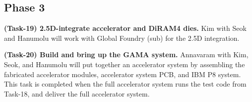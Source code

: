 \subsection{Phase 3}
\noindent
\textbf{(Task-19) 2.5D-integrate accelerator and DiRAM4 dies.}
Kim with Seok and Hanumolu will work with Global Foundry (sub) for the 2.5D integration.


\vspace{3pt}
\noindent
\textbf{(Task-20) Build and bring up the GAMA system.}
Annavaram with Kim, Seok, and Hanumolu will put together an accelerator system by assembling
the fabricated accelerator modules, accelerator system PCB, and IBM P8 system.
This task is completed when the full accelerator system runs the test code from Task-18, and deliver the full accelerator system.


\begin{comment}
Task 3.X: Our accelerator chip fabrication and chip-level testing \underline{Seok (Columbia), Kim (UIUC), Hanumolu (UIUC), Annavaram (USC), Hwu (UIUC)}
Completion criteria: fabricated chips, verified in the chip level
Approach: We will perform intensive pre-silicon verifications for functional, thermal, voltage integrity, noise, and testability aspects. We will tape-out the accelerator chip in a 28nm CMOS technology. We will test the accelerator chip without DiRAMs. 
Task 3.2: 2.5D integration of our accelerator chip and memory stacks, packaging, and testing \underline{?}
Completion criteria and deliverables: Functioning 2.5D integrated hardware of the accelerators and DiRAMs. 
Approach:  We will integrate the accelerator chip with two DiRAMs using a silicon interposer. 
The silicon interposer that creates 2,000 connection to the accelerator chip per DiRAM will be fabricated by a company (XXXXX). 
The interposer will be either connected to a custom PCB directly or enclosed on a BGA type package. 
If necessary, we will mount a off-the-shelf cooler, potentially modified to fit, on top of the accelerator chip. 
\end{comment}

